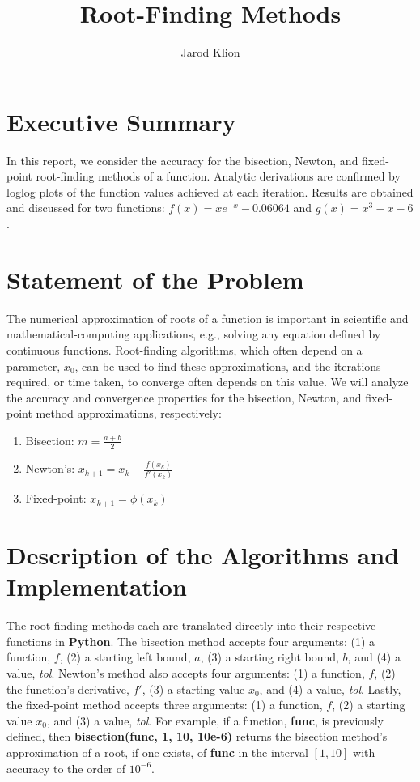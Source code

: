 \documentclass[11pt]{article}
\author{Jarod Klion}
\title{Root-Finding Methods}
\begin{document}
\maketitle

\section{Executive Summary}

In this report, we consider the accuracy for the bisection, Newton, and fixed-point root-finding methods of a function. Analytic derivations are confirmed by loglog plots of the function values achieved at each iteration. Results are obtained and discussed for two functions: $f(x) = xe^{-x} - 0.06064$ and $g(x) = x^3 - x - 6$.

\section{Statement of the Problem}

The numerical approximation of roots of a function is important in scientific and mathematical-computing applications, e.g., solving any equation defined by continuous functions. Root-finding algorithms, which often depend on a parameter, $x_0$, can be used to find these approximations, and the iterations required, or time taken, to converge often depends on this value. We will analyze the accuracy and convergence properties for the bisection, Newton, and fixed-point method approximations, respectively:
\begin{enumerate}
	\item Bisection: $m = \frac{a + b}{2}$
	\item Newton's: $x_{k+1} = x_k - \frac{f(x_k)}{f'(x_k)}$
	\item Fixed-point: $x_{k+1} = \phi(x_k)$
\end{enumerate}


\section{Description of the Algorithms and Implementation}

The root-finding methods each are translated directly into their respective functions in \textbf{Python}. The bisection method accepts four arguments: (1) a function, $f$, (2) a starting left bound, $a$, (3) a starting right bound, $b$, and (4) a value, \emph{tol}. Newton's method also accepts four arguments: (1) a function, $f$, (2) the function's derivative, $f'$, (3) a starting value $x_0$, and (4) a value, \emph{tol}. Lastly, the fixed-point method accepts three arguments: (1) a function, $f$, (2) a starting value $x_0$, and (3) a value, \emph{tol}. For example, if a function, \textbf{func}, is previously defined, then \textbf{bisection(func, 1, 10, 10e-6)} returns the bisection method's approximation of a root, if one exists, of \textbf{func} in the interval $[1, 10]$ with accuracy to the order of $10^{-6}$.
\end{document}
